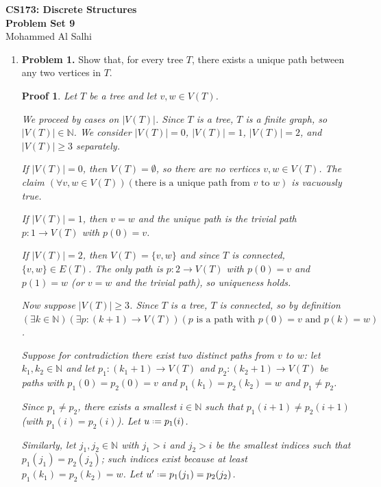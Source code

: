 \documentclass[12pt]{article}
\newcommand{\defeq}{\mathrel{\vcenter{\baselineskip0.5ex \lineskiplimit0pt
                     \hbox{\scriptsize.}\hbox{\scriptsize.}}}=}
\newcommand{\N}{\mathbb{N}}
\theoremstyle{proofstyle}
\newtheorem*{proof*}{Proof}
\renewcommand{\maketitle}{%
  \begin{flushleft}
    {\Large\bfseries CS173: Discrete Structures}\\[0.3em]
    {\Large\bfseries Problem Set 9}\\[0.5em]
    {\normalsize Mohammed Al Salhi}
  \end{flushleft}
  \vspace{1em}
}
\begin{document}
\maketitle

\begin{enumerate}[left=0pt, itemsep=2em, parsep=1em]

\item[]
\begin{questionbox}
\textbf{Problem 1.} Show that, for every tree $T$, there exists a unique path between any two vertices in $T$.
\end{questionbox}

\begin{proof*}

Let $T$ be a tree and let $v, w \in V(T)$.

We proceed by cases on $|V(T)|$. Since $T$ is a tree, $T$ is a finite graph,
so $|V(T)| \in \N$. We consider $|V(T)| = 0$, $|V(T)| = 1$, $|V(T)| = 2$,
and $|V(T)| \geq 3$ separately.

If $|V(T)| = 0$, then $V(T) = \emptyset$, so there are no vertices $v, w \in V(T)$.
The claim $(\forall v, w \in V(T))(\text{there is a unique path from } v \text{ to } w)$
is vacuously true.

If $|V(T)| = 1$, then $v = w$ and the unique path is the trivial path $p : 1 \to V(T)$
with $p(0) = v$.

If $|V(T)| = 2$, then $V(T) = \{v, w\}$ and since $T$ is connected, $\{v, w\} \in E(T)$.
The only path is $p : 2 \to V(T)$ with $p(0) = v$ and $p(1) = w$ (or $v = w$ and
the trivial path), so uniqueness holds.

Now suppose $|V(T)| \geq 3$. Since $T$ is a tree, $T$ is connected, so by definition
$(\exists k \in \N)(\exists p : (k+1) \to V(T))(p \text{ is a path with } p(0) = v
\text{ and } p(k) = w)$.

Suppose for contradiction there exist two distinct paths from $v$ to $w$:
let $k_1, k_2 \in \N$ and let $p_1 : (k_1+1) \to V(T)$ and $p_2 : (k_2+1) \to V(T)$
be paths with $p_1(0) = p_2(0) = v$ and $p_1(k_1) = p_2(k_2) = w$ and $p_1 \neq p_2$.

Since $p_1 \neq p_2$, there exists a smallest $i \in \N$ such that $p_1(i+1) \neq p_2(i+1)$
(with $p_1(i) = p_2(i)$). Let $u \defeq p_1(i)$.

Similarly, let $j_1, j_2 \in \N$ with $j_1 > i$ and $j_2 > i$ be the smallest indices such that
$p_1(j_1) = p_2(j_2)$; such indices exist because at least $p_1(k_1) = p_2(k_2) = w$.
Let $u' \defeq p_1(j_1) = p_2(j_2)$.


\end{proof*}
\end{enumerate}
\end{document}
